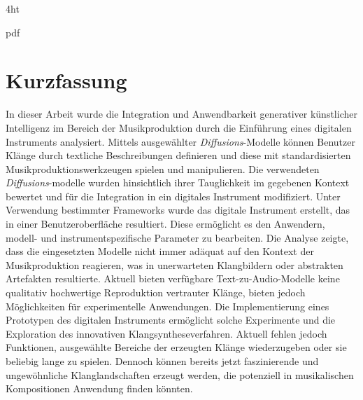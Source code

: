 \documentclass[
  a4paper,  %
  twoside,  %
  bibliography=totoc,
  headsepline,
  cleardoublepage=empty,
  parskip=half,
  draft=false
]{scrbook}
\begin{document}
\iftex4ht
  \Configure{$}{\PicMath}{\EndPicMath}{}

  {pdf}
  {%
  }
\fi



\Coverpage
\Copyright
\pagestyle{preamble}
\renewcommand*{\chapterpagestyle}{preamble}



\section*{Kurzfassung}

In dieser Arbeit wurde die Integration und Anwendbarkeit generativer künstlicher Intelligenz im Bereich der Musikproduktion durch die Einführung eines digitalen Instruments analysiert. Mittels ausgewählter \emph{Diffusions}-Modelle können Benutzer Klänge durch textliche Beschreibungen definieren und diese mit standardisierten Musikproduktionswerkzeugen spielen und manipulieren. Die verwendeten \emph{Diffusions}-modelle wurden hinsichtlich ihrer Tauglichkeit im gegebenen Kontext bewertet und für die Integration in ein digitales Instrument modifiziert. Unter Verwendung bestimmter Frameworks wurde das digitale Instrument erstellt, das in einer Benutzeroberfläche resultiert. Diese ermöglicht es den Anwendern, modell- und instrumentspezifische Parameter zu bearbeiten. Die Analyse zeigte, dass die eingesetzten Modelle nicht immer adäquat auf den Kontext der Musikproduktion reagieren, was in unerwarteten Klangbildern oder abstrakten Artefakten resultierte. Aktuell bieten verfügbare Text-zu-Audio-Modelle keine qualitativ hochwertige Reproduktion vertrauter Klänge, bieten jedoch Möglichkeiten für experimentelle Anwendungen. Die Implementierung eines Prototypen des digitalen Instruments ermöglicht solche Experimente und die Exploration des innovativen Klangsyntheseverfahren. Aktuell fehlen jedoch Funktionen, ausgewählte Bereiche der erzeugten Klänge wiederzugeben oder sie beliebig lange zu spielen. Dennoch können bereits jetzt faszinierende und ungewöhnliche Klanglandschaften erzeugt werden, die potenziell in musikalischen Kompositionen Anwendung finden könnten. 
\end{document}
